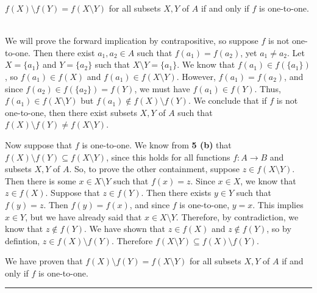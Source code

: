 \documentclass[11pt]{hmcpset}
\newenvironment{problem2}[1]{\noindent {\bf (#1}}
{\medskip}
\newenvironment{proof}{\noindent {\bf Proof:} \\}{\hfill
\rule{1mm}{3mm} \bigskip}
\begin{document}
\begin{problem2}{c)} $f(X)\setminus f(Y)=f(X\setminus Y)$ for all subsets $X,Y$ of $A$ if and only if $f$ is one-to-one.

\begin{proof}\indent We will prove the forward implication by contrapositive, so suppose $f$ is not one-to-one. Then there exist $a_1,a_2 \in A$ such that $f(a_1)=f(a_2)$, yet $a_1\ne a_2$. Let $X=\{a_1\}$ and $Y=\{a_2\}$ such that $X\setminus Y =\{a_1\}$. We know that $f(a_1)\in f(\{a_1\})$, so $f(a_1)\in f(X)$ and $f(a_1)\in f(X\setminus Y)$. However, $f(a_1)=f(a_2)$, and since $f(a_2)\in f(\{a_2\}) =f(Y)$, we must have $f(a_1)\in f(Y).$ Thus, $f(a_1)\in f(X\setminus Y)$ but $f(a_1)\notin f(X)\setminus f(Y).$ We conclude that if $f$ is not one-to-one, then there exist subsets $X,Y$ of $A$ such that $f(X)\setminus f(Y)\ne f(X\setminus Y)$.

Now suppose that $f$ is one-to-one. We know from \textbf{5 (b)} that $f(X)\setminus f(Y)\subseteq f(X\setminus Y)$, since this holds for all functions $f:A\to B$ and subsets $X,Y$ of $A$. So, to prove the other containment, suppose $z\in f(X\setminus Y).$ Then there is some $x\in X\setminus Y$ such that $f(x)=z$. Since $x\in X$, we know that $z\in f(X)$. Suppose that $z\in f(Y).$ Then there exists $y\in Y$ such that $f(y)=z$. Then $f(y)=f(x)$, and since $f$ is one-to-one, $y=x$. This implies $x\in Y$, but we have already said that $x\in X\setminus Y$. Therefore, by contradiction, we know that $z\notin f(Y)$. We have shown that $z\in f(X)$ and $z\notin f(Y)$, so by defintion, $z\in f(X)\setminus f(Y)$. Therefore $ f(X\setminus Y)\subseteq f(X)\setminus f(Y)$.

We have proven that $f(X)\setminus f(Y)=f(X\setminus Y)$ for all subsets $X,Y$ of $A$ if and only if $f$ is one-to-one.
\end{proof}
\end{problem2}
\end{document}
